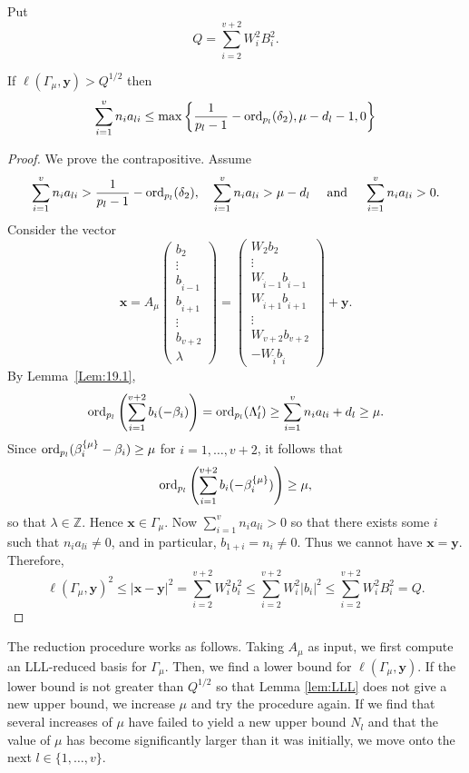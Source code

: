 Put
\[Q = \sum_{i = 2}^{v+2} W_i^2 B_i^2.\]

\begin{lemma} \label{lem:LLL}
If $\ell(\Gamma_{\mu},\mathbf{y}) > Q^{1/2}$ then
\[\sum_{i = 1}^v n_{i}a_{li} \leq \max\left\{ \frac{1}{p_l-1} - \operatorname{ord}_{p_l}(\delta_2), \mu - d_l - 1,0\right\}\]
\end{lemma}

\begin{proof}
We prove the contrapositive. Assume 
\[\sum_{i = 1}^v n_{i}a_{li} > \frac{1}{p_l-1} - \operatorname{ord}_{p_l}(\delta_2), \quad \sum_{i = 1}^v n_{i}a_{li} > \mu - d_l 
\quad \text{ and } \quad \sum_{i = 1}^v n_{i}a_{li} > 0.\]
Consider the vector
\[\mathbf{x} = A_{\mu}
\begin{pmatrix}
b_2\\
\vdots\\
b_{\hat{i}-1}\\
b_{\hat{i}+1}\\
\vdots\\
b_{v+2}\\
\lambda
\end{pmatrix}
= 
\begin{pmatrix}
W_2b_2\\
\vdots\\
W_{\hat{i}-1}b_{\hat{i}-1}\\
W_{\hat{i}+1}b_{\hat{i}+1}\\
\vdots\\
W_{v+2}b_{v+2}\\
-W_{\hat{i}}b_{\hat{i}}
\end{pmatrix}
+ \mathbf{y}.\]
By Lemma~\ref{Lem:19.1},  
\[\operatorname{ord}_{p_l}\left( \sum_{i=1}^{v+2}b_i(-\beta_i)\right) = \operatorname{ord}_{p_l}(\Lambda_l') \geq\sum_{i = 1}^v n_{i}a_{li} + d_l \geq \mu.\]
Since $\operatorname{ord}_{p_l}(\beta_i^{\{\mu\}} - \beta_i) \geq \mu$ for $i = 1, \dots, v+2$, it follows that
\[\operatorname{ord}_{p_l}\left( \sum_{i=1}^{v+2}b_i(-\beta_i^{\{\mu\}})\right) \geq \mu,\]
so that $\lambda \in \mathbb{Z}$. Hence $\mathbf{x} \in \Gamma_{\mu}$. Now $\sum_{i = 1}^v n_{i}a_{li} > 0$ so that there exists some $i$ such that $n_ia_{li} \neq 0$, and in particular, $b_{1+i} = n_i \neq 0$. Thus we cannot have $\mathbf{x} = \mathbf{y}$. Therefore, 
\[\ell(\Gamma_{\mu}, \mathbf{y})^2 \leq |\mathbf{x} - \mathbf{y}|^2 = \sum_{i = 2}^{v+2}W_i^2 b_i^2
\leq  \sum_{i = 2}^{v+2}W_i^2 |b_i|^2 \leq  \sum_{i = 2}^{v+2}W_i^2 B_i^2 = Q.\]
\end{proof}

The reduction procedure works as follows. Taking $A_{\mu}$ as input, we first compute an LLL-reduced basis for $\Gamma_{\mu}$. Then, we find a lower bound for $\ell(\Gamma_{\mu}, \mathbf{y})$. If the lower bound is not greater than $Q^{1/2}$ so that Lemma \ref{lem:LLL} does not give a new upper bound, we increase $\mu$ and try the procedure again. If we find that several increases of $\mu$ have failed to yield a new upper bound $N_l$ and that the value of $\mu$ has become significantly larger than it was initially, we move onto the next $l \in \{1, \dots, v\}$.

